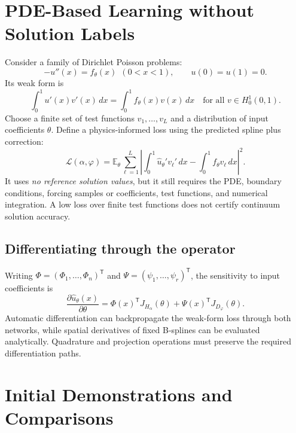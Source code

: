 \section{PDE-Based Learning without Solution Labels}
\label{sec:scho-physics}

Consider a family of Dirichlet Poisson problems:
\begin{equation}
  -u''(x)=f_\theta(x)\ \ (0<x<1),\qquad u(0)=u(1)=0.
  \label{eq:scho-poisson}
\end{equation}
Its weak form is
\begin{equation}
  \int_0^1u'(x)v'(x)\,dx=\int_0^1 f_\theta(x)v(x)\,dx
  \quad\text{for all }v\in H_0^1(0,1).
  \label{eq:scho-weak}
\end{equation}
Choose a finite set of test functions $v_1,\ldots,v_L$ and a
distribution of input coefficients $\theta$. Define a physics-informed
loss using the predicted spline plus correction:
\begin{equation}
  \boxed{\mathcal L(\alpha,\varphi)=
    \mathbb E_\theta\sum_{\ell=1}^{L}
    \left|\int_0^1\widehat u_\theta'v_\ell'\,dx
    -\int_0^1f_\theta v_\ell\,dx\right|^2.}
  \label{eq:scho-weak-loss}
\end{equation}
It uses \emph{no reference solution values}, but it still requires
the PDE, boundary conditions, forcing samples or coefficients,
test functions, and numerical integration. A low loss over finite
test functions does not certify continuum solution accuracy.

\subsection{Differentiating through the operator}

Writing $\Phi=(\Phi_1,\ldots,\Phi_n)^\mathsf T$ and
$\Psi=(\psi_1,\ldots,\psi_r)^\mathsf T$, the sensitivity to input
coefficients is
\begin{equation}
  \frac{\partial\widehat u_\theta(x)}{\partial\theta}
  =\Phi(x)^\mathsf T J_{H_\alpha}(\theta)
  +\Psi(x)^\mathsf T J_{D_\varphi}(\theta).
  \label{eq:scho-jacobian}
\end{equation}
Automatic differentiation can backpropagate the weak-form loss through
both networks, while spatial derivatives of fixed B-splines can be
evaluated analytically. Quadrature and projection operations must
preserve the required differentiation paths.




\section{Initial Demonstrations and Comparisons}
\label{sec:scho-roadmap}

